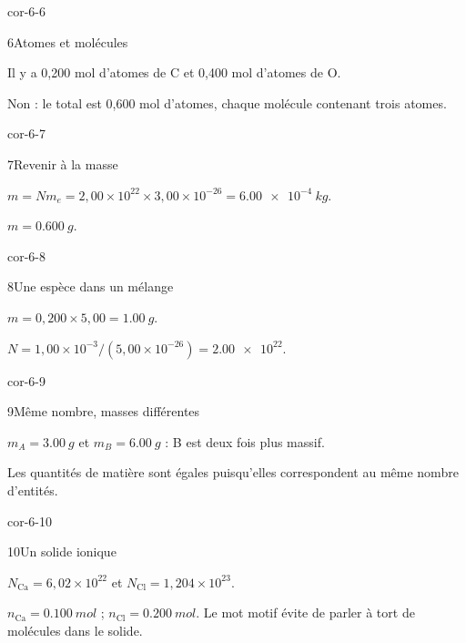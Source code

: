 \begin{blocLivre}{cor-6-6}\begin{corrige}{6}{Atomes et molécules}
\begin{questions}
\item Il y a 0,200 mol d’atomes de C et 0,400 mol d’atomes de O.
\item Non : le total est 0,600 mol d’atomes, chaque molécule contenant trois atomes.
\end{questions}
\end{corrige}\end{blocLivre}
\begin{blocLivre}{cor-6-7}\begin{corrige}{7}{Revenir à la masse}
\begin{questions}
\item $m=Nm_e=2,00\times10^{22}\times3,00\times10^{-26}=\qty{6,00e-4}{kg}$.
\item $m=\qty{0,600}{g}$.
\end{questions}
\end{corrige}\end{blocLivre}
\begin{blocLivre}{cor-6-8}\begin{corrige}{8}{Une espèce dans un mélange}
\begin{questions}
\item $m=0,200\times5,00=\qty{1,00}{g}$.
\item $N=1,00\times10^{-3}/(5,00\times10^{-26})=\num{2,00e22}$.
\end{questions}
\end{corrige}\end{blocLivre}
\begin{blocLivre}{cor-6-9}\begin{corrige}{9}{Même nombre, masses différentes}
\begin{questions}
\item $m_A=\qty{3,00}{g}$ et $m_B=\qty{6,00}{g}$ : B est deux fois plus massif.
\item Les quantités de matière sont égales puisqu’elles correspondent au même nombre d’entités.
\end{questions}
\end{corrige}\end{blocLivre}
\begin{blocLivre}{cor-6-10}\begin{corrige}{10}{Un solide ionique}
\begin{questions}
\item $N_{\mathrm{Ca}}=6,02\times10^{22}$ et $N_{\mathrm{Cl}}=1,204\times10^{23}$.
\item $n_{\mathrm{Ca}}=\qty{0,100}{mol}$ ; $n_{\mathrm{Cl}}=\qty{0,200}{mol}$. Le mot motif évite de parler à tort de molécules dans le solide.
\end{questions}
\end{corrige}\end{blocLivre}
